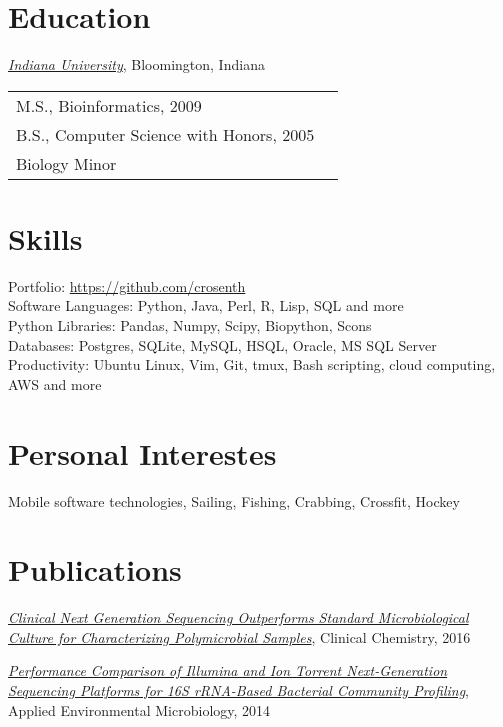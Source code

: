 \documentclass{res}
\begin{document}
\begin{resume}
\section{Education}
\href{http://www.iub.edu/}{\textit{Indiana University}}, Bloomington, Indiana\\
\begin{tabular}{p{10cm} l} 
M.S., Bioinformatics, 2009\\
B.S., Computer Science with Honors, 2005\\
Biology Minor
\end{tabular}

\section{Skills}
Portfolio: \url{https://github.com/crosenth}\\
Software Languages: Python, Java, Perl, R, Lisp, SQL and more\\
Python Libraries: Pandas, Numpy, Scipy, Biopython, Scons\\
Databases: Postgres, SQLite, MySQL, HSQL, Oracle, MS SQL Server\\
Productivity: Ubuntu Linux, Vim, Git, tmux, Bash scripting, cloud computing, AWS and more

\section{Personal Interestes}
Mobile software technologies, Sailing, Fishing, Crabbing, Crossfit, Hockey

\section{Publications}
\renewcommand{\section}[2]{}
\begin{thebibliography}{4}
    \href{http://clinchem.aaccjnls.org/content/62/11/1465}
         {\textit{Clinical Next Generation Sequencing Outperforms Standard 
                  Microbiological Culture for Characterizing 
                  Polymicrobial Samples}},
         Clinical Chemistry, 2016

    \href{http://aem.asm.org/content/80/24/7583}
         {\textit{Performance Comparison of Illumina and Ion Torrent 
                  Next-Generation Sequencing Platforms for 16S rRNA-Based 
                  Bacterial Community Profiling}},
         Applied Environmental Microbiology, 2014


\end{thebibliography}
\end{resume}
\end{document}
